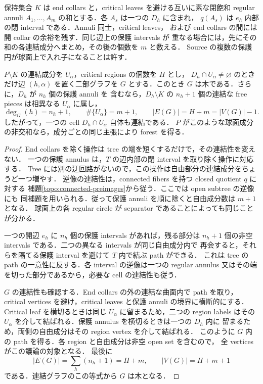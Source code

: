 保持集合 $K$ は end collars と，critical leaves を避ける互いに素な閉飽和
regular annuli $A_1,\ldots,A_m$ の和とする．各 $A_s$ は一つの $D_h$ に含まれ，
$q(A_s)$ は $e_h$ 内部の閉 interval である．Annuli 同士，critical leaves，
および end collars の間には開 collar の余裕を残す．同じ辺上の保護 intervals が
重なる場合には，先にその和の各連結成分へまとめ，その後の個数を $m$ と数える．
Source の複数の保護円が球面上で入れ子になることは許す．

\begin{proposition}
\label{ng8:spherical-incidence-tree}
$P\setminus K$ の連結成分を $U_\alpha$，critical regions の個数を $H$ とし，
$D_h\cap U_\alpha\ne\varnothing$ のときだけ辺 $(h,\alpha)$ を置く二部グラフを
$G$ とする．このとき $G$ は木である．さらに，$D_h$ が $n_h$ 個の保護 annuli を
含むなら，$D_h\setminus K$ の $n_h+1$ 個の連結な free pieces は相異なる
$U_\alpha$ に属し，
\[
 \deg_G(h)=n_h+1,\qquad
 \#\{U_\alpha\}=m+1,\qquad
 |E(G)|=H+m=|V(G)|-1.
\]
したがって，一つの cell $D_h\cap U_\alpha$ 自体も連結である．
$P$ がこのような球面成分の非交和なら，成分ごとの同じ主張により forest を得る．
\end{proposition}

\begin{proof}
End collars を除く操作は tree の端を短くするだけで，その連結性を変えない．
一つの保護 annulus は，$T$ の辺内部の閉 interval を取り除く操作に対応する．
Tree には別の迂回路がないので，この操作は自由部分の連結成分をちょうど一つ増やす．
逆像の連結性は，connected fibers を持つ closed quotient $q$ に対する
補題\ref{topo:connected-preimages}から従う．ここでは open subtree の逆像にも
同補題を用いられる．従って保護 annuli を順に除くと自由成分数は $m+1$ となる．
球面上の各 regular circle が separator であることによっても同じことが分かる．

一つの開辺 $e_h$ に $n_h$ 個の保護 intervals があれば，残る部分は
$n_h+1$ 個の非空 intervals である．二つの異なる intervals が同じ自由成分内で
再会すると，それらを隔てる保護 interval を避けて $T$ 内で結ぶ path ができる．
これは tree の path の一意性に反する．各 interval の逆像は一つの regular
annulus 又はその端を切った部分であるから，必要な cell の連結性も従う．

$G$ の連結性も確認する．End collars の外の連結な曲面内で path を取り，
critical vertices を避け，critical leaves と保護 annuli の境界に横断的にする．
Critical leaf を横切るときは同じ $U_\alpha$ に留まるため，二つの region labels
はその $U_\alpha$ を介して結ばれる．保護 annulus を横切るときは一つの $D_h$ 内に
留まるため，両側の自由成分はその region vertex を介して結ばれる．
このように $G$ 内の path を得る．各 region と自由成分は非空 open set を含むので，
全 vertices がこの議論の対象となる．
最後に
\[
 |E(G)|=\sum_h(n_h+1)=H+m,\qquad |V(G)|=H+m+1
\]
である．連結グラフのこの等式から $G$ は木となる．
\end{proof}

